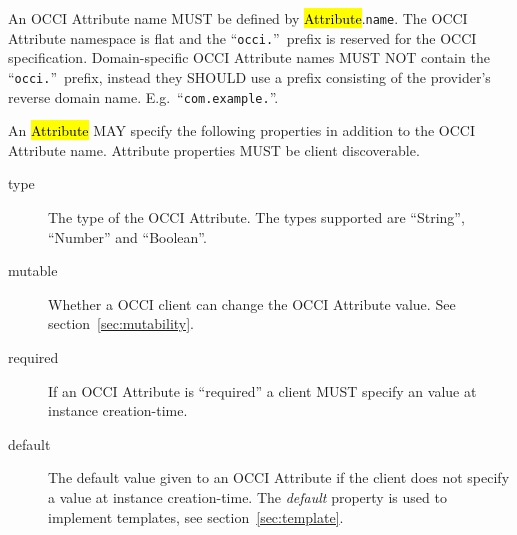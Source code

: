 \documentclass[10pt,a4paper]{article}
\begin{document}

An OCCI Attribute name MUST be defined by \hl{Attribute}.{\tt name}. The
OCCI Attribute namespace is flat and the ``\texttt{occi.}''~prefix is reserved
for the OCCI specification.
Domain-specific OCCI Attribute names MUST NOT contain the
``\texttt{occi.}''~prefix, instead they SHOULD use a prefix consisting of the
provider's reverse domain name. E.g.~``\texttt{com.example.}''.

An \hl{Attribute} MAY specify the following properties in addition to the OCCI
Attribute name. Attribute properties MUST be client discoverable.
\begin{description}
\item[type] The type of the OCCI Attribute. The types supported are ``String'',
  ``Number'' and ``Boolean''.

\item[mutable] Whether a OCCI client can change the OCCI Attribute value. See
  section~\ref{sec:mutability}.

\item[required] If an OCCI Attribute is ``required'' a client MUST specify an
  value at instance creation-time.

\item[default] The default value given to an OCCI Attribute if the client does
  not specify a value at instance creation-time.  The {\em default} property is
  used to implement templates, see section~\ref{sec:template}.
\end{description}
\end{document}

